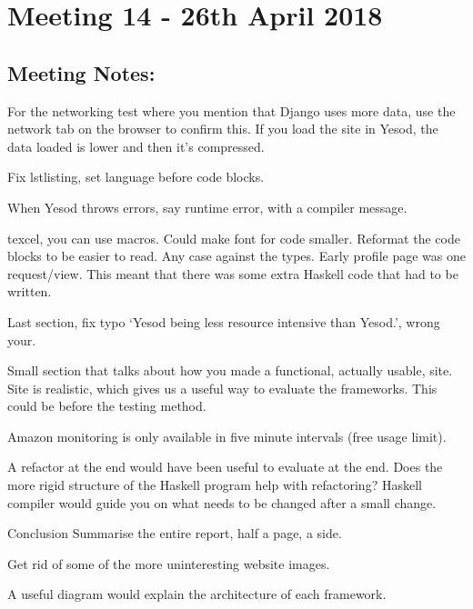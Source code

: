 \section{Meeting 14 - 26th April 2018}

\subsection{Meeting Notes:}


For the networking test where you mention that Django uses more data,
use the network tab on the browser to confirm this. If you load
the site in Yesod, the data loaded is lower and then it's compressed.

Fix lstlisting, set language before code blocks.

When Yesod throws errors, say runtime error, with a compiler message.

texcel, you can use macros. Could make font for code smaller.
Reformat the code blocks to be easier to read.
Any case against the types. Early profile page was one request/view. This meant that
there was some extra Haskell code that had to be written.

Last section, fix typo `Yesod being less resource intensive than Yesod.', wrong
your.

Small section that talks about how you made a functional, actually usable,
site. Site is realistic, which gives us a useful way to evaluate the frameworks.
This could be before the testing method.

Amazon monitoring is only available in five minute intervals (free usage limit).

A refactor at the end would have been useful to evaluate at the end. Does
the more rigid structure of the Haskell program help with refactoring?
Haskell compiler would guide you on what needs to be changed after a
small change.

Conclusion
Summarise the entire report, half a page, a side.

Get rid of some of the more uninteresting website images.

A useful diagram would explain the architecture of each framework.